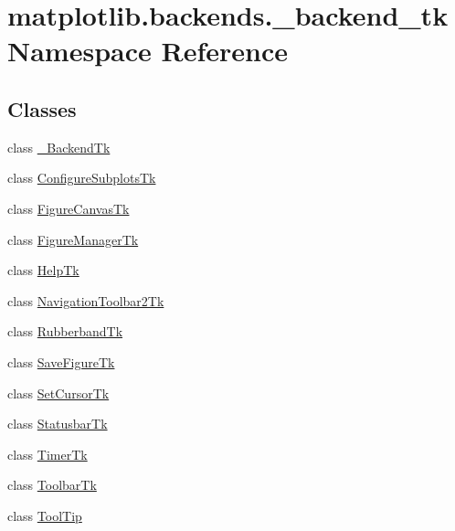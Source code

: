 \hypertarget{namespacematplotlib_1_1backends_1_1__backend__tk}{}\section{matplotlib.\+backends.\+\_\+backend\+\_\+tk Namespace Reference}
\label{namespacematplotlib_1_1backends_1_1__backend__tk}
\subsection*{Classes}
\begin{DoxyCompactItemize}
\item 
class \hyperlink{classmatplotlib_1_1backends_1_1__backend__tk_1_1__BackendTk}{\+\_\+\+Backend\+Tk}
\item 
class \hyperlink{classmatplotlib_1_1backends_1_1__backend__tk_1_1ConfigureSubplotsTk}{Configure\+Subplots\+Tk}
\item 
class \hyperlink{classmatplotlib_1_1backends_1_1__backend__tk_1_1FigureCanvasTk}{Figure\+Canvas\+Tk}
\item 
class \hyperlink{classmatplotlib_1_1backends_1_1__backend__tk_1_1FigureManagerTk}{Figure\+Manager\+Tk}
\item 
class \hyperlink{classmatplotlib_1_1backends_1_1__backend__tk_1_1HelpTk}{Help\+Tk}
\item 
class \hyperlink{classmatplotlib_1_1backends_1_1__backend__tk_1_1NavigationToolbar2Tk}{Navigation\+Toolbar2\+Tk}
\item 
class \hyperlink{classmatplotlib_1_1backends_1_1__backend__tk_1_1RubberbandTk}{Rubberband\+Tk}
\item 
class \hyperlink{classmatplotlib_1_1backends_1_1__backend__tk_1_1SaveFigureTk}{Save\+Figure\+Tk}
\item 
class \hyperlink{classmatplotlib_1_1backends_1_1__backend__tk_1_1SetCursorTk}{Set\+Cursor\+Tk}
\item 
class \hyperlink{classmatplotlib_1_1backends_1_1__backend__tk_1_1StatusbarTk}{Statusbar\+Tk}
\item 
class \hyperlink{classmatplotlib_1_1backends_1_1__backend__tk_1_1TimerTk}{Timer\+Tk}
\item 
class \hyperlink{classmatplotlib_1_1backends_1_1__backend__tk_1_1ToolbarTk}{Toolbar\+Tk}
\item 
class \hyperlink{classmatplotlib_1_1backends_1_1__backend__tk_1_1ToolTip}{Tool\+Tip}
\end{DoxyCompactItemize}
